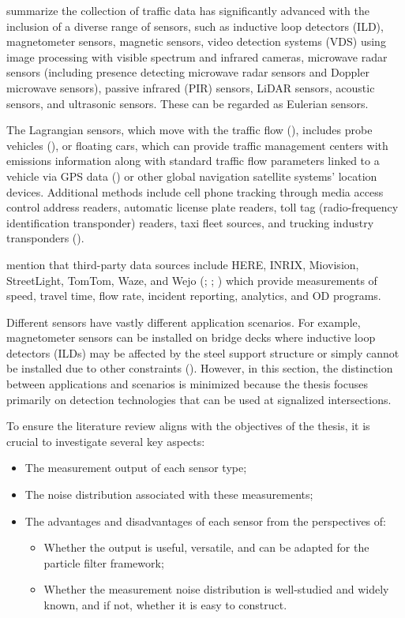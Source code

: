 \textcite{klein2024roadside} summarize the collection of traffic data has significantly advanced with the inclusion of a diverse range of sensors, such as inductive loop detectors (ILD), magnetometer sensors, magnetic sensors, video detection systems (VDS) using image processing with visible spectrum and infrared cameras, microwave radar sensors (including presence detecting microwave radar sensors and Doppler microwave sensors), passive infrared (PIR) sensors, LiDAR sensors, acoustic sensors, and ultrasonic sensors. These can be regarded as Eulerian sensors. 

The Lagrangian sensors, which move with the traffic flow (\textcite{bayen2010mobile}), includes probe vehicles (\textcite{turner1998travel}), or floating cars, which can provide traffic management centers with emissions information along with standard traffic flow parameters linked to a vehicle via GPS data (\textcite{pack2021use}) or other global navigation satellite systems’ location devices. Additional methods include cell phone tracking through media access control address readers, automatic license plate readers, toll tag (radio-frequency identification transponder) readers, taxi fleet sources, and trucking industry transponders (\textcite{singer2013travel}).

\textcite{klein2024roadside} mention that third-party data sources include HERE, INRIX, Miovision, StreetLight, TomTom, Waze, and Wejo (\textcite{coifman2013assessing}; \textcite{mccracken2016assessment}; \textcite{tsapakis2021independent}) which provide measurements of speed, travel time, flow rate, incident reporting, analytics, and OD programs.

Different sensors have vastly different application scenarios. For example, magnetometer sensors can be installed on bridge decks where inductive loop detectors (ILDs) may be affected by the steel support structure or simply cannot be installed due to other constraints (\textcite{klein2024roadside}). However, in this section, the distinction between applications and scenarios is minimized because the thesis focuses primarily on detection technologies that can be used at signalized intersections.

To ensure the literature review aligns with the objectives of the thesis, it is crucial to investigate several key aspects:
\begin{itemize}
    \item The measurement output of each sensor type;
    \item The noise distribution associated with these measurements;
    \item The advantages and disadvantages of each sensor from the perspectives of:
    \begin{itemize}
        \item Whether the output is useful, versatile, and can be adapted for the particle filter framework;
        \item Whether the measurement noise distribution is well-studied and widely known, and if not, whether it is easy to construct.
    \end{itemize}
\end{itemize}

